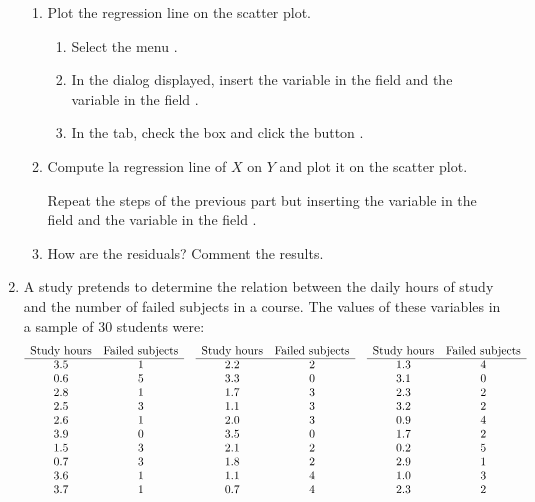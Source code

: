 \begin{enumerate}[leftmargin=*]
\begin{enumerate}
\item Plot the regression line on the scatter plot.
\begin{indication}
\begin{enumerate}
\item Select the menu .
\item In the dialog displayed, insert the variable  in the field  and the
variable  in the field .
\item In the  tab, check the box  and click the button
.
\end{enumerate}
\end{indication}

\item Compute la regression line of $X$ on $Y$ and plot it on the scatter plot.
\begin{indication}
Repeat the steps of the previous part but inserting the variable  in the field 
and the variable  in the field . 
\end{indication}

\item How are the residuals?
Comment the results.
\end{enumerate}


\item A study pretends to determine the relation between the daily hours of study and the number of failed subjects in
a course. 
The values of these variables in a sample of 30 students were:
\[
\begin{array}{cccccccc}
\text{Study hours} & \text{Failed subjects} &  & \text{Study hours} & \text{Failed subjects} & & \text{Study hours} &
\text{Failed subjects}
\\
\cline{1-2}\cline{4-5}\cline{7-8}
3.5 & 1 & & 2.2 & 2 & & 1.3 & 4 \\
0.6 & 5 & & 3.3 & 0 & & 3.1 & 0 \\
2.8 & 1 & & 1.7 & 3 & & 2.3 & 2 \\
2.5 & 3 & & 1.1 & 3 & & 3.2 & 2 \\
2.6 & 1 & & 2.0 & 3 & & 0.9 & 4 \\
3.9 & 0 & & 3.5 & 0 & & 1.7 & 2 \\
1.5 & 3 & & 2.1 & 2 & & 0.2 & 5 \\
0.7 & 3 & & 1.8 & 2 & & 2.9 & 1 \\
3.6 & 1 & & 1.1 & 4 & & 1.0 & 3 \\
3.7 & 1 & & 0.7 & 4 & & 2.3 & 2 \\
\end{array}
\]


\end{enumerate}
